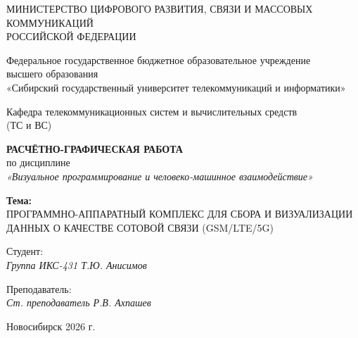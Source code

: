 \documentclass[a4paper,14pt,oneside,openany]{memoir}
\begin{document}
\thispagestyle{empty}
\begin{center}
    МИНИСТЕРСТВО ЦИФРОВОГО РАЗВИТИЯ, СВЯЗИ И МАССОВЫХ КОММУНИКАЦИЙ \\
    РОССИЙСКОЙ ФЕДЕРАЦИИ

    \vspace{20pt}

    Федеральное государственное бюджетное образовательное учреждение \\
    высшего образования \\
    «Сибирский государственный университет телекоммуникаций и информатики»

    \vspace{20pt}

    Кафедра телекоммуникационных систем и вычислительных средств \\
    (ТС и ВС)
\end{center}

\vfill

\begin{center}
    \textbf{РАСЧЁТНО-ГРАФИЧЕСКАЯ РАБОТА} \\
    по дисциплине \\
    \textit{«Визуальное программирование и человеко-машинное взаимодействие»}

    \vspace{20pt}

    \textbf{Тема:} \\
    \uppercase{Программно-аппаратный комплекс для сбора и визуализации данных
    о качестве сотовой связи (GSM/LTE/5G)}
\end{center}

\vfill

\noindent Студент: \\
\textit{Группа ИКС-431 \hfill Т.Ю. Анисимов}

\vspace{20pt}

\noindent Преподаватель: \\
\textit{Ст. преподаватель \hfill Р.В. Ахпашев}

\vfill

\begin{center}
    Новосибирск 2026 г.
\end{center}

\newpage
\setcounter{page}{2}
\OnehalfSpacing*

\tableofcontents*
\newpage

\end{document}
